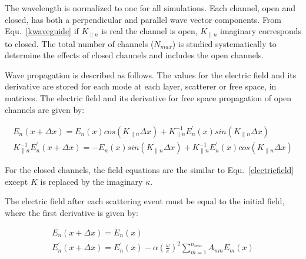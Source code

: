 The wavelength is normalized to one for all simulations.  
Each channel, open and closed, has both a perpendicular and parallel wave vector components.
From Equ.~\ref{kwaveguide} if $K_{\parallel n}$ is real the channel is open, $K_{\parallel n}$ imaginary 
corresponds to closed.  The total number of channels ($N_{max}$) is
studied systematically to determine the effects of closed channels and 
includes the open channels.

Wave propagation is described as follows.  The values for the electric 
field and its derivative are stored for each mode at each layer, scatterer 
or free space, in matrices. The electric field and its derivative for free 
space propagation of open channels are given by:

\begin{equation}
\begin{gathered}
E_n(x+\Delta x)=E_n(x)cos(K_{\parallel n}\Delta x)+K_{\parallel n}^{-1}
E_n^{'}(x)sin(K_{\parallel n}\Delta x) \\
K_{\parallel n}^{-1}E_n^{'}(x+\Delta x)=-E_n(x)sin(K_{\parallel n} \Delta x)
+K_{\parallel n}^{-1}E_n^{'}(x)cos(K_{\parallel n}\Delta x)
\end{gathered}
\label{electricfield}
\end{equation}

For the closed channels, the field equations are the similar to 
Equ.~\ref{electricfield} except $K$ is replaced by the imaginary $\kappa$.

\begin{comment}
\begin{equation}
\begin{gathered}
E_n(x+\Delta x)=E_n(x)cosh(\kappa_{\parallel n}\Delta x)+
\kappa_{\parallel n}^{-1}E_n^{'}(x)sinh(\kappa_{\parallel n}\Delta x)\\
\kappa_{\parallel n}^{-1}E_n^{'}(x+\Delta x)=E_n(x)sinh(\kappa_{\parallel n}
\Delta x)+\kappa_{\parallel n}^{-1}E_n^{'}(x)cos(\kappa_{\parallel n}\Delta x)
\end{gathered}
\end{equation}
\end{comment}

The electric field after each scattering event must be equal to the
initial field, where the first derivative is given by:

\begin{equation}
\begin{gathered}
E_n(x+\Delta x)=E_n(x)\\
E_n^{'}(x+\Delta x)=E_n^{'}(x)-\alpha(\frac{\omega}{c})^2\sum_{m=1}^{n_{max}}
A_{nm}E_m(x) 
\end{gathered}
\end{equation}

